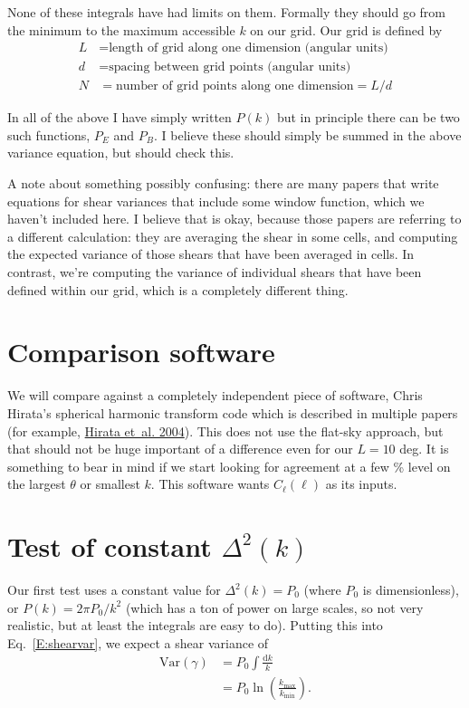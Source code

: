 \documentclass[preprint]{aastex}
\newcommand{\kmax}{\ensuremath{k_\mathrm{max}}}
\newcommand{\kmin}{\ensuremath{k_\mathrm{min}}}
\newcommand{\rmd}{\ensuremath{\mathrm{d}}}
\begin{document}
None of these integrals have had limits on them.  Formally they should
go from the minimum to the maximum accessible $k$ on our grid.  Our
grid is defined by
\begin{align}
L &= \mbox{length of grid along one dimension (angular units)}\\
d &= \mbox{spacing between grid points (angular units)}\\
N &= \mbox{number of grid points along one dimension} = L/d
\end{align}

In all of the above I have simply written $P(k)$ but in principle there can be
two such functions, $P_{E}$ and $P_B$.  I believe these
should simply be summed in the above variance equation, but should check this.

A note about something possibly confusing: there are many papers that
write equations for shear variances that include some window function,
which we haven't included here.  I believe that is okay, because those
papers are referring to a different calculation: they are averaging
the shear in some cells, and computing the expected variance of those
shears that have been averaged in cells.  In contrast, we're computing
the variance of individual shears that have been defined within our
grid, which is a completely different thing.

\section{Comparison software}

We will compare against a completely independent piece of software,
Chris Hirata's spherical harmonic transform code which is described in
multiple papers (for example,
\href{http://adsabs.harvard.edu/abs/2004PhRvD..70j3501H}{Hirata
  et~al. 2004}).  This does not use the flat-sky
approach, but that should not be huge important of a difference even
for our $L=10$ deg.  It is something to bear in mind if we start
looking for agreement at a few \% level on the largest $\theta$ or
smallest $k$.  This software wants $C_\ell(\ell)$ as its inputs.

\section{Test of constant $\Delta^2(k)$}

Our first test uses a constant value for $\Delta^2(k)=P_0$ (where
$P_0$ is dimensionless), or
$P(k)=2\pi P_0/k^2$ (which has a ton of power on large scales, so not
very realistic, but at least the integrals are easy to do).  Putting this into Eq.~\ref{E:shearvar},
we expect a shear variance of
\begin{align}
\mathrm{Var}(\gamma) &= P_0 \int \frac{\rmd k}{k} \\
 &= P_0 \ln{\left(\frac{\kmax}{\kmin}\right)}.
\end{align}
\end{document}
